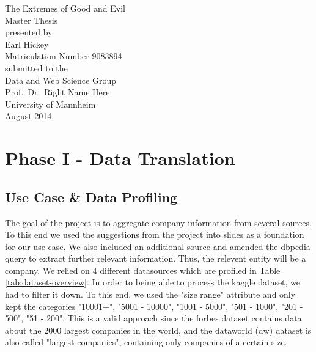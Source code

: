 \documentclass[11pt,titlepage,oneside,openany]{book}
\begin{document}
\begin{titlepage}
	\vspace*{2cm}
  \begin{center}
   {\Large The Extremes of Good and Evil\\}
   \vspace{2cm} 
   {Master Thesis\\}
   \vspace{2cm}
   {presented by\\
    Earl Hickey \\
    Matriculation Number 9083894\\
   }
   \vspace{1cm} 
   {submitted to the\\
    Data and Web Science Group\\
    Prof.\ Dr.\ Right Name Here\\
    University of Mannheim\\} \vspace{2cm}
   {August 2014}
  \end{center}
\end{titlepage} 

\tableofcontents
\newpage

\listoffigures

\listoftables


\newpage



\chapter{Phase I - Data Translation}
\label{cha:data-translation}
 
\section{Use Case \& Data Profiling}
The goal of the project is to aggregate company information from several sources. To this end we used the suggestions from the project into slides as a foundation for our use case. We also included an additional source and amended the dbpedia query to extract further relevant information. Thus, the relevent entity will be a company.
We relied on 4 different datasources which are profiled in Table \ref{tab:dataset-overview}. In order to being able to process the kaggle dataset, we had to filter it down. To this end, we used the "size range" attribute and only kept the categories "10001+", "5001 - 10000", "1001 - 5000", "501 - 1000", "201 - 500", "51 - 200". This is a valid approach since the forbes dataset contains data about the 2000 largest companies in the world, and the dataworld (dw) dataset is also called "largest companies", containing only companies of a certain size.
\end{document}
